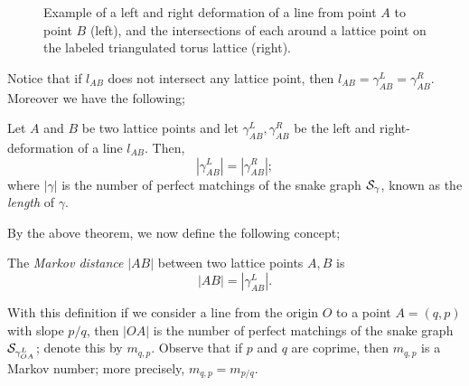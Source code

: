 \begin{figure}[H]


    \caption{Example of a left and right deformation of a line from point $A$ to point $B$ (left), and the intersections of each around a lattice point on the labeled triangulated torus lattice (right).}
\end{figure}
Notice that if $l_{AB}$ does not intersect any lattice point, then $l_{AB}= \gamma_{AB}^L = \gamma_{AB}^R$. Moreover we have the following;
\begin{theorem}
    Let $A$ and $B$ be two lattice points and let $\gamma_{AB}^L, \gamma_{AB}^R$ be the left and right-deformation of a line $l_{AB}$. Then,
    \begin{equation}
        |\gamma_{AB}^L| = |\gamma_{AB}^R|;
    \end{equation}
    where $|\gamma|$ is the number of perfect matchings of the snake graph $\mathcal{S}_{\gamma}$, known as the \emph{length} of $\gamma$. 
\end{theorem}
By the above theorem, we now define the following concept;
\begin{definition}
    The \emph{Markov distance} $|AB|$ between two lattice points $A,B$ is 
\begin{equation*}
    |AB| = |\gamma_{AB}^L|.
\end{equation*}
\end{definition}
With this definition if we consider a line from the origin $O$ to a point $A = (q,p)$ with slope $p/q$, then $|OA|$ is the number of perfect matchings of the snake graph $\mathcal{S}_{\gamma_{OA}^L}$; denote this by $m_{q,p}$. Observe that if $p$ and $q$ are coprime, then $m_{q,p}$ is a Markov number; more precisely, $m_{q,p} = m_{p/q}$. 

